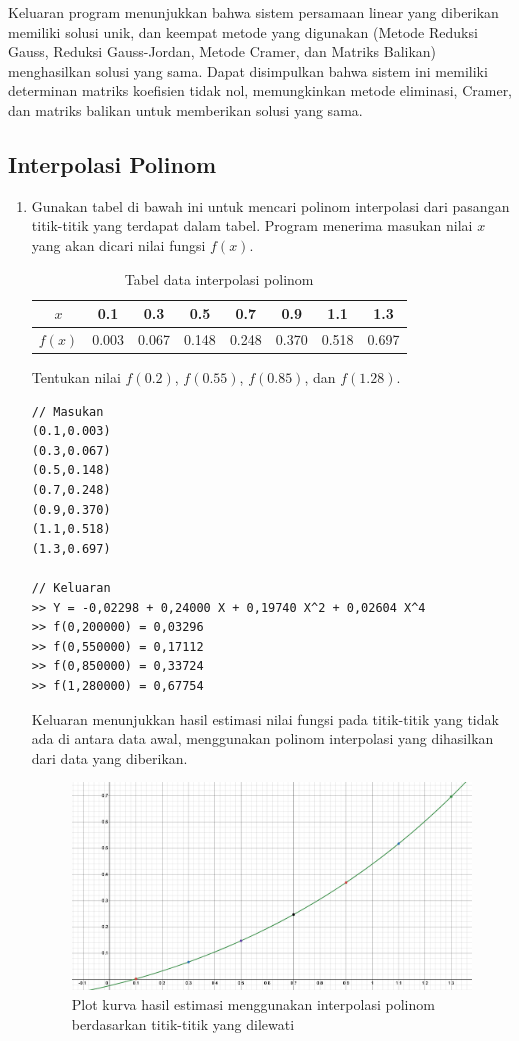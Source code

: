 Keluaran program menunjukkan bahwa sistem persamaan linear yang diberikan memiliki solusi unik, dan keempat metode yang digunakan (Metode Reduksi Gauss, Reduksi Gauss-Jordan, Metode Cramer, dan Matriks Balikan) menghasilkan solusi yang sama. Dapat disimpulkan bahwa sistem ini memiliki determinan matriks koefisien tidak nol, memungkinkan metode eliminasi, Cramer, dan matriks balikan untuk memberikan solusi yang sama.

\pagebreak
\subsection{Interpolasi Polinom}
\begin{enumerate}[label=(\alph*)]
    \item Gunakan tabel di bawah ini untuk mencari polinom interpolasi dari pasangan titik-titik yang terdapat dalam tabel. Program menerima masukan nilai $x$ yang akan dicari nilai fungsi $f(x)$.

    
    \begin{table}[H]
        \centering
        \caption{Tabel data interpolasi polinom}
        \begin{tabular}{c||ccccccc}
            $x$     & 0.1   & 0.3   & 0.5   & 0.7   & 0.9   & 1.1   & 1.3 \\
            \hline
            $f(x)$  & 0.003 & 0.067 & 0.148 & 0.248 & 0.370 & 0.518 & 0.697 \\
        \end{tabular}
    \end{table}

    Tentukan nilai $f(0.2)$, $f(0.55)$, $f(0.85)$, dan $f(1.28)$.

\begin{lstlisting}[caption = interpol-a.txt]
// Masukan
(0.1,0.003)
(0.3,0.067)
(0.5,0.148)
(0.7,0.248)
(0.9,0.370)
(1.1,0.518)
(1.3,0.697)

// Keluaran
>> Y = -0,02298 + 0,24000 X + 0,19740 X^2 + 0,02604 X^4
>> f(0,200000) = 0,03296
>> f(0,550000) = 0,17112
>> f(0,850000) = 0,33724
>> f(1,280000) = 0,67754\end{lstlisting}

Keluaran menunjukkan hasil estimasi nilai fungsi pada titik-titik yang tidak ada di antara data awal, menggunakan polinom interpolasi yang dihasilkan dari data yang diberikan.
\begin{figure}[H]
    \centering
    \includegraphics[width=0.75\linewidth]{image2.png}
    \caption{Plot kurva hasil estimasi menggunakan interpolasi polinom berdasarkan titik-titik yang dilewati}
\end{figure}


\end{enumerate}
